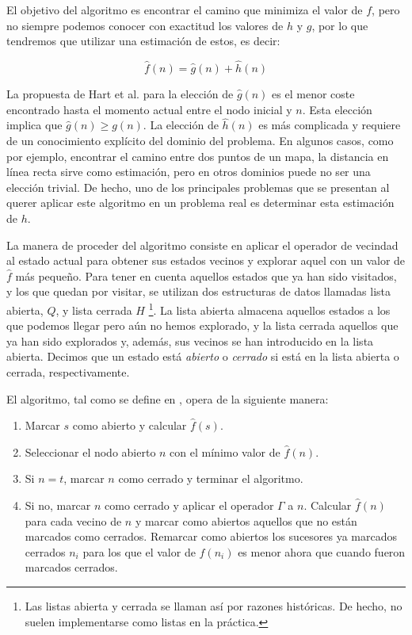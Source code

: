 \documentclass[a4paper,12pt]{article}
\begin{document}
El objetivo del algoritmo es encontrar el camino que minimiza el valor de $f$, pero no siempre podemos conocer con exactitud los valores de $h$ y $g$, por lo que tendremos que utilizar una estimación de estos, es decir:

\begin{equation}
\hat{f}(n) = \hat{g}(n) + \hat{h}(n)
\end{equation}

La propuesta de Hart et al. \cite{hart_formal_1968} para la elección de $\hat{g}(n)$ es el menor coste encontrado hasta el momento actual entre el nodo inicial y $n$. Esta elección implica que $\hat{g}(n) \geq g(n)$. La elección de $\hat{h}(n)$ es más complicada y requiere de un conocimiento explícito del dominio del problema. En algunos casos, como por ejemplo, encontrar el camino entre dos puntos de un mapa, la distancia en línea recta sirve como estimación, pero en otros dominios puede no ser una elección trivial. De hecho, uno de los principales problemas que se presentan al querer aplicar este algoritmo en un problema real es determinar esta estimación de $h$.

La manera de proceder del algoritmo consiste en aplicar el operador de vecindad al estado actual para obtener sus estados vecinos y explorar aquel con un valor de $\hat{f}$ más pequeño. Para tener en cuenta aquellos estados que ya han sido visitados, y los que quedan por visitar, se utilizan dos estructuras de datos llamadas lista abierta, $Q$, y lista cerrada $H$ \footnote{Las listas abierta y cerrada se llaman así por razones históricas. De hecho, no suelen implementarse como listas en la práctica.}. La lista abierta almacena aquellos estados a los que podemos llegar pero aún no hemos explorado, y la lista cerrada aquellos que ya han sido explorados y, además, sus vecinos se han introducido en la lista abierta. Decimos que un estado está \textit{abierto} o \textit{cerrado} si está en la lista abierta o cerrada, respectivamente.

El algoritmo, tal como se define en \cite{hart_formal_1968}, opera de la siguiente manera:

\begin{enumerate}
\item Marcar $s$ como abierto y calcular $\hat{f}(s)$. \label{as:p1}
\item Seleccionar el nodo abierto $n$ con el mínimo valor de $\hat{f}(n)$. \label{as:p2}
\item Si $n = t$, marcar $n$ como cerrado y terminar el algoritmo. \label{as:p3}
\item Si no, marcar $n$ como cerrado y aplicar el operador $\Gamma$ a $n$. Calcular $\hat{f}(n)$ para cada vecino de $n$ y marcar como abiertos aquellos que no están marcados como cerrados. Remarcar como abiertos los sucesores ya marcados cerrados $n_i$ para los que el valor de $\hat{f}(n_i)$ es menor ahora que cuando fueron marcados cerrados. \label{as:p4}
\end{enumerate}
\end{document}

